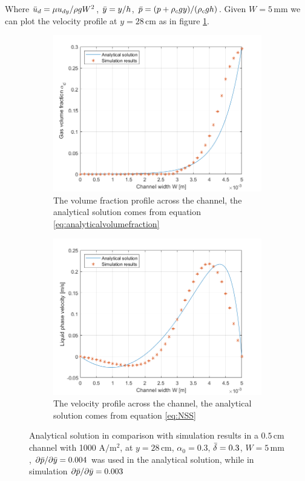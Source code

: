 Where $\Bar{u}_d = \mu u_{dy}/\rho g W^2$, $\Bar{y} = y/h$, $\Bar{p} = (p + \rho_c g y)/(\rho_c g h)$. Given $W = 5 \, \mathrm{mm}$ we can plot the velocity profile at $y = 28 \, \mathrm{cm}$ as in figure \ref{analyticalcomparison}.

\begin{figure}[H]
\centering
\begin{subfigure}{.45\textwidth}
  \centering
  \includegraphics[width=1\linewidth]{volumefractioncomparison.png}
  \caption{The volume fraction profile across the channel, the analytical solution comes from equation \ref{eq:analyticalvolumefraction}}
\end{subfigure}
\begin{subfigure}{.45\textwidth}
  \centering
  \includegraphics[width=1\linewidth]{Comparisonvelocityprofile.png}
  \caption{The velocity profile across the channel, the analytical solution comes from equation \ref{eq:NSS}}
\end{subfigure}
\caption{Analytical solution in comparison with simulation results in a  $0.5 \, \mathrm{cm} $ channel with 1000 $\mathrm{A/m^2}$, at $y = 28 \, \mathrm{cm}$, $\alpha_0 = 0.3$, $\Bar {\delta}=0.3$, $W= 5\, \mathrm{mm}$, $ \partial \Bar{p}/ \partial \Bar{y} = 0.004$ was used in the analytical solution, while in simulation $ \partial \Bar{p}/ \partial \Bar{y} = 0.003$ }
\label{analyticalcomparison}
\end{figure}

